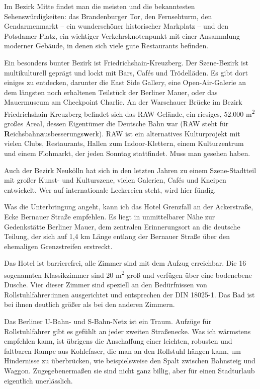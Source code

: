 \documentclass[fontsize=14pt,a4paper,headinclude,DIV=calc,automark]{scrbook}
\begin{document}
Im Bezirk Mitte findet man die meisten und die bekanntesten Sehenswürdigkeiten: das Brandenburger Tor, den Fernsehturm, den Gendarmenmarkt – ein wunderschöner historischer Markplatz – und den Potsdamer Platz, ein wichtiger Verkehrsknotenpunkt mit einer Ansammlung moderner Gebäude, in denen sich viele gute Restaurants befinden.

Ein besonders bunter Bezirk ist Friedrichshain-Kreuzberg. Der Szene-Bezirk ist multikulturell geprägt und lockt mit Bars, Cafés und Trödelläden. Es gibt dort einiges zu entdecken, darunter die East Side Gallery, eine Open-Air-Galerie an dem längsten noch erhaltenen Teilstück der Berliner Mauer, oder das Mauermuseum am Checkpoint Charlie. An der Warschauer Brücke im Bezirk Friedrichshain-Kreuzberg befindet sich das RAW-Gelände, ein riesiges, 52.000 m\textsuperscript{2} großes Areal, dessen Eigentümer die Deutsche Bahn war (RAW steht für \textbf{R}eichsbahn\textbf{a}usbesserungs\textbf{w}erk). RAW ist ein alternatives Kulturprojekt mit vielen Clubs, Restaurants, Hallen zum Indoor-Klettern, einem Kulturzentrum und einem Flohmarkt, der jeden Sonntag stattfindet. Muss man gesehen haben.

Auch der Bezirk Neukölln hat sich in den letzten Jahren zu einem Szene-Stadtteil mit großer Kunst- und Kulturszene, vielen Galerien, Cafés und Kneipen entwickelt. Wer auf internationale Leckereien steht, wird hier fündig.

Was die Unterbringung angeht, kann ich das Hotel Grenzfall an der Ackerstraße, Ecke Bernauer Straße empfehlen. Es liegt in unmittelbarer Nähe zur Gedenkstätte Berliner Mauer, dem zentralen Erinnerungsort an die deutsche Teilung, der sich auf 1,4 km Länge entlang der Bernauer Straße über den ehemaligen Grenzstreifen erstreckt.

Das Hotel ist barrierefrei, alle Zimmer sind mit dem Aufzug erreichbar. Die 16 sogenannten Klassikzimmer sind 20 m\textsuperscript{2} groß und verfügen über eine bodenebene Dusche. Vier dieser Zimmer sind speziell an den Bedürfnissen von Rollstuhlfahrer:innen ausgerichtet und entsprechen der DIN 18025-1. Das Bad ist bei ihnen deutlich größer als bei den anderen Zimmern.

Das Berliner U-Bahn- und S-Bahn-Netz ist ein Traum. Aufzüge für Rollstuhlfahrer gibt es gefühlt an jeder zweiten Straßenecke. Was ich wärmstens empfehlen kann, ist übrigens die Anschaffung einer leichten, robusten und faltbaren Rampe aus Kohlefaser, die man an den Rollstuhl hängen kann, um Hindernisse zu überbrücken, wie beispielsweise den Spalt zwischen Bahnsteig und Waggon. Zugegebenermaßen sie sind nicht ganz billig, aber für einen Stadturlaub eigentlich unerlässlich.
\end{document}
